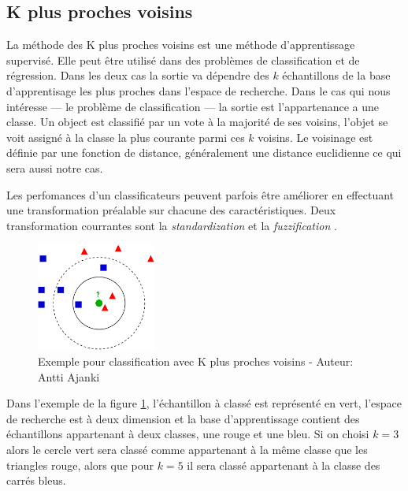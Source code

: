         \subsection{K plus proches voisins}
        
        La méthode des K plus proches voisins est une méthode d’apprentissage supervisé.
        Elle peut être utilisé dans des problèmes de classification et de régression.
        Dans les deux cas la sortie va dépendre des $k$ échantillons de la base d'apprentisage les plus proches dans l'espace de recherche.
        Dans le cas qui nous intéresse --- le problème de classification --- la sortie est l'appartenance a une classe. 
        Un object est classifié par un vote à la majorité de ses voisins, l'objet se voit assigné à la classe la plus courante parmi ces $k$ voisins.
        Le voisinage est définie par une fonction de distance, généralement une distance euclidienne ce qui sera aussi notre cas.
        
        Les perfomances d'un classificateurs peuvent parfois être améliorer en effectuant une transformation préalable sur chacune des caractéristiques.
        Deux transformation courrantes sont la \emph{standardization} et la \emph{fuzzification} \cite{peterson2009k}.
        
\begin{figure}[H]
    \centerline{
        \includegraphics[width=0.35\textwidth,fbox]{img/Knn_Example}
    }
    \caption{Exemple pour classification avec K plus proches voisins - Auteur: Antti Ajanki}
    \label{KNNpic}
\end{figure}

        Dans l'exemple de la figure \ref{KNNpic}, l'échantillon à classé est représenté en vert, l'espace de recherche est à deux dimension et la base d'apprentissage contient des échantillons appartenant à deux classes, une rouge et une bleu.
        Si on choisi $k=3$ alors le cercle vert sera classé comme appartenant à la même classe que les triangles rouge, alors que pour $k=5$ il sera classé appartenant à la classe des carrés bleus.
        

